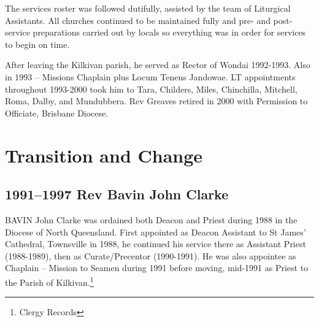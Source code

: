 The services roster was followed dutifully, assisted by the team of Liturgical Assistants. All churches continued to be maintained fully and pre- and post-service preparations carried out by locals so everything was in order for services to begin on time.



After leaving the Kilkivan parish, he served as Rector of Wondai 1992-1993. Also in 1993 -- Missions Chaplain plus Locum Tenens Jandowae. LT appointments throughout 1993-2000 took him to Tara, Childers, Miles, Chinchilla, Mitchell, Roma, Dalby, and Mundubbera. Rev Greaves retired in 2000 with Permission to Officiate, Brisbane Diocese.



\balance


\printendnotes[custom]
\setcounter{endnote}{0}
\chapter{Transition and Change}
\nobalance


\section{1991--1997 Rev Bavin John Clarke}



\lettrine[lines=3]{B}{AVIN}
 John Clarke was ordained both Deacon and Priest during 1988 in the Diocese of North Queensland. First appointed as Deacon Assistant to St James' Cathedral, Townsville in 1988, he continued his service there as Assistant Priest (1988-1989), then as Curate/Precentor (1990-1991). He was also appointee as Chaplain -- Mission to Seamen during 1991 before moving, mid-1991 as Priest to the Parish of Kilkivan.\footnote{Clergy Records}







